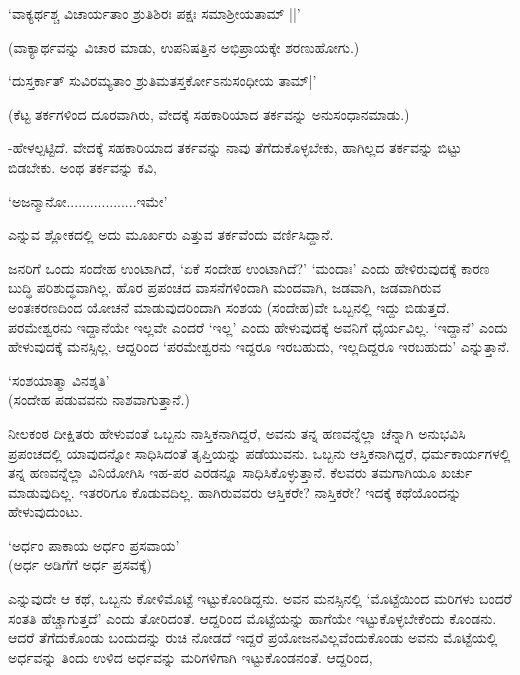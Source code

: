 \begin{shloka}
`ವಾಕ್ಯರ್ಥಶ್ಚ ವಿಚಾರ್ಯತಾಂ ಶ್ರುತಿಶಿರಃ ಪಕ್ಷಃ ಸಮಾಶ್ರೀಯತಾಮ್ ||'
\end{shloka}

(ವಾಕ್ಯಾರ್ಥವನ್ನು ವಿಚಾರ ಮಾಡು, ಉಪನಿಷತ್ತಿನ ಅಭಿಪ್ರಾಯಕ್ಕೇ ಶರಣುಹೋಗು.)

\begin{shloka}
`ದುಸ್ತರ್ಕಾತ್ ಸುವಿರಮ್ಯತಾಂ ಶ್ರುತಿಮತಸ್ತರ್ಕೋಽನುಸಂಧೀಯ ತಾಮ್|'
\end{shloka}

(ಕೆಟ್ಟ ತರ್ಕಗಳಿಂದ ದೂರವಾಗಿರು, ವೇದಕ್ಕೆ ಸಹಕಾರಿಯಾದ ತರ್ಕವನ್ನು ಅನುಸಂಧಾನಮಾಡು.)

-ಹೇಳಲ್ಪಟ್ಟಿದೆ. ವೇದಕ್ಕೆ ಸಹಕಾರಿಯಾದ ತರ್ಕವನ್ನು ನಾವು ತೆಗೆದುಕೊಳ್ಳಬೇಕು, ಹಾಗಿಲ್ಲದ ತರ್ಕವನ್ನು ಬಿಟ್ಟು ಬಿಡಬೇಕು. ಅಂಥ ತರ್ಕವನ್ನು ಕವಿ,

\begin{shloka}
`ಅಜನ್ಮಾನೋ..................ಇಮೇ'
\end{shloka}

ಎನ್ನುವ ಶ್ಲೋಕದಲ್ಲಿ ಅದು ಮೂರ್ಖರು ಎತ್ತುವ ತರ್ಕವೆಂದು ವರ್ಣಿಸಿದ್ದಾನೆ.

ಜನರಿಗೆ ಒಂದು ಸಂದೇಹ ಉಂಟಾಗಿದೆ, `ಏಕೆ ಸಂದೇಹ ಉಂಟಾಗಿದೆ?' `ಮಂದಾಃ' ಎಂದು ಹೇಳಿರುವುದಕ್ಕೆ ಕಾರಣ ಬುದ್ಧಿ ಪರಿಶುದ್ಧವಾಗಿಲ್ಲ. ಹೊರ ಪ್ರಪಂಚದ ವಾಸನೆಗಳಿಂದಾಗಿ ಮಂದವಾಗಿ, ಜಡವಾಗಿ, ಜಡವಾಗಿರುವ ಅಂತಃಕರಣದಿಂದ ಯೋಚನೆ ಮಾಡುವುದರಿಂದಾಗಿ ಸಂಶಯ (ಸಂದೇಹ)ವೇ ಒಬ್ಬನಲ್ಲಿ ಇದ್ದು ಬಿಡುತ್ತದೆ. ಪರಮೇಶ್ವರನು ಇದ್ದಾನೆಯೇ ಇಲ್ಲವೇ ಎಂದರೆ `ಇಲ್ಲ' ಎಂದು ಹೇಳುವುದಕ್ಕೆ ಅವನಿಗೆ ಧೈರ್ಯವಿಲ್ಲ. `ಇದ್ದಾನೆ' ಎಂದು ಹೇಳುವುದಕ್ಕೆ ಮನಸ್ಸಿಲ್ಲ. ಆದ್ದರಿಂದ `ಪರಮೇಶ್ವರನು ಇದ್ದರೂ ಇರಬಹುದು, ಇಲ್ಲದಿದ್ದರೂ ಇರಬಹುದು' ಎನ್ನುತ್ತಾನೆ.

\begin{shloka}
`ಸಂಶಯಾತ್ಮಾ ವಿನಶ್ಶತಿ'\\
(ಸಂದೇಹ ಪಡುವವನು ನಾಶವಾಗುತ್ತಾನೆ.)
\end{shloka}

ನೀಲಕಂಠ ದೀಕ್ಷಿತರು ಹೇಳುವಂತೆ ಒಬ್ಬನು ನಾಸ್ತಿಕನಾಗಿದ್ದರೆ, ಅವನು ತನ್ನ ಹಣವನ್ನೆಲ್ಲಾ ಚೆನ್ನಾಗಿ ಅನುಭವಿಸಿ ಪ್ರಪಂಚದಲ್ಲಿ ಯಾವುದನ್ನೋ ಸಾಧಿಸಿದಂತೆ ತೃಪ್ತಿಯನ್ನು ಪಡೆಯುವನು. ಒಬ್ಬನು ಆಸ್ತಿಕನಾಗಿದ್ದರೆ, ಧರ್ಮಕಾರ್ಯಗಳಲ್ಲಿ ತನ್ನ ಹಣವನ್ನೆಲ್ಲಾ ವಿನಿಯೋಗಿಸಿ ಇಹ-ಪರ ಎರಡನ್ನೂ ಸಾಧಿಸಿಕೊಳ್ಳುತ್ತಾನೆ. ಕೆಲವರು ತಮಗಾಗಿಯೂ ಖರ್ಚು ಮಾಡುವುದಿಲ್ಲ. ಇತರರಿಗೂ ಕೊಡುವದಿಲ್ಲ. ಹಾಗಿರುವವರು ಆಸ್ತಿಕರೇ? ನಾಸ್ತಿಕರೇ? ಇದಕ್ಕೆ ಕಥೆಯೊಂದನ್ನು ಹೇಳುವುದುಂಟು.

\begin{shloka}
`ಅರ್ಧಂ ಪಾಕಾಯ ಅರ್ಧಂ ಪ್ರಸವಾಯ'\\
(ಅರ್ಧ ಅಡಿಗೆಗೆ ಅರ್ಧ ಪ್ರಸವಕ್ಕೆ)
\end{shloka}

ಎನ್ನುವುದೇ ಆ ಕಥೆ, ಒಬ್ಬನು ಕೋಳಿಮೊಟ್ಟೆ ಇಟ್ಟುಕೊಂಡಿದ್ದನು. ಅವನ ಮನಸ್ಸಿನಲ್ಲಿ `ಮೊಟ್ಟೆಯಿಂದ ಮರಿಗಳು ಬಂದರೆ ಸಂತತಿ ಹೆಚ್ಚಾಗುತ್ತದೆ' ಎಂದು ತೋರಿದಂತೆ. ಆದ್ದರಿಂದ ಮೊಟ್ಟೆಯನ್ನು ಹಾಗೆಯೇ ಇಟ್ಟುಕೊಳ್ಳಬೇಕೆಂದು ಕೊಂಡನು. ಆದರೆ ತೆಗೆದುಕೊಂಡು ಬಂದುದನ್ನು ರುಚಿ ನೋಡದೆ ಇದ್ದರೆ ಪ್ರಯೋಜನವಿಲ್ಲವೆಂದುಕೊಂಡು ಅವನು ಮೊಟ್ಟೆಯಲ್ಲಿ ಅರ್ಧವನ್ನು ತಿಂದು ಉಳಿದ ಅರ್ಧವನ್ನು ಮರಿಗಳಿಗಾಗಿ ಇಟ್ಟುಕೊಂಡನಂತೆ. ಆದ್ದರಿಂದ,

